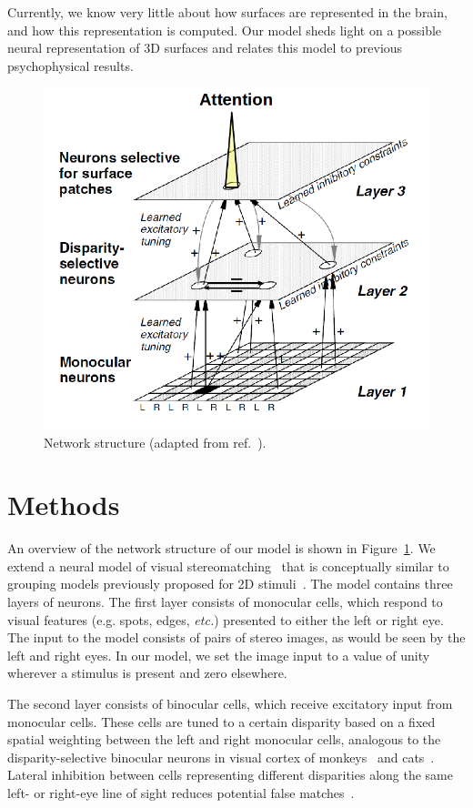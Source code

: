 \documentclass[conference]{IEEEtran}
\begin{document}
Currently, we know very little about how surfaces are represented in
the brain, and how this representation is computed.  Our model sheds
light on a possible neural representation of 3D surfaces and relates
this model to previous psychophysical results.

\begin{figure} [h!]
\centering
\vspace{-10pt}
\includegraphics[width=3 in]{figs/groupingcircuit}
\caption{Network structure (adapted from ref.~\cite{Marshall_etal96}).}
\label{NetworkStructure}
\end{figure}

\section{Methods}
An overview of the network structure of our model is shown in
Figure~\ref{NetworkStructure}. We extend a neural model of visual
stereomatching~\cite{Marshall_etal96} that is conceptually similar to
grouping models previously proposed for 2D stimuli~\cite{Craft_etal07,
  Mihalas_etal11b, Russell_etal14}.  The model contains three layers
of neurons. The first layer consists of monocular cells, which respond
to visual features (e.g. spots, edges, {\em etc.}) presented to either
the left or right eye. The input to the model consists of pairs of
stereo images, as would be seen by the left and right eyes. In our
model, we set the image input to a value of unity wherever a stimulus is present and zero elsewhere.

The second layer consists of binocular cells, which receive excitatory
input from monocular cells. These cells are tuned
to a certain disparity based on a fixed spatial weighting between the
left and right monocular cells, analogous to the disparity-selective
binocular neurons in visual cortex of
monkeys~\cite{Poggio_Fischer77, Poggio_Poggio84} and
cats~\cite{Bishop_Pettigrew86, Ohzawa_etal90}. Lateral inhibition
between cells representing different disparities along the same left-
or right-eye line of sight reduces potential false matches~\cite{Marr_Poggio76}.
\end{document}
